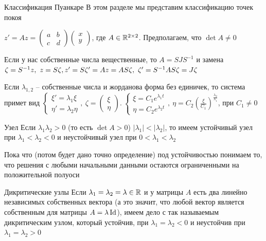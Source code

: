 \documentclass[12pt]{article}
\begin{document}
\begin{nota}{Классификация Пуанкаре}
    В этом разделе мы представим классификацию точек покоя

    $z' = Az = \begin{pmatrix}
        a & b \\
        c & d 
    \end{pmatrix} \begin{pmatrix}
        x \\ 
        y 
    \end{pmatrix}$, где $A \in \mathbb R^{2 \times 2}$. Предполагаем, что $\det A \neq 0$

    Если у нас собственные числа вещественные, то $A = SJS^{-1}$ и замена $\zeta = S^{-1}z,\ z = S\zeta,\\ z' = S\zeta' = Az = AS\zeta,\ \zeta' = S^{-1}AS\zeta = J\zeta$

    Если $\lambda_{1, 2}$ -- собственные числа и жорданова форма без единичек, то система примет вид $\begin{cases}
        \xi' = \lambda_1 \xi \\
        \eta' = \lambda_2 \eta
    \end{cases},\ \zeta = \begin{pmatrix}
        \xi \\
        \eta
    \end{pmatrix}.\ \begin{cases}
        \xi = C_1e^{\lambda_1 t} \\
        \eta = C_2e^{\lambda_2 t}
    \end{cases},\ \eta = C_2 \left(\frac{\xi}{C_1}\right)^\frac{\lambda_2}{\lambda_1}$, при $C_1 \neq 0$
\end{nota}

\begin{defin}{Узел}
    Если $\lambda_1\lambda_2 > 0$ (то есть $\det A > 0$) $|\lambda_1| < |\lambda_2|$, то имеем устойчивый узел при $\lambda_1 < \lambda_2 < 0$ и неустойчивый узел при $0 < \lambda_1 < \lambda_2$

    Пока что (потом будет дано точно определение) под устойчивостью понимаем то, что решения с любыми начальными данными остаются ограниченными на положительной полуоси
\end{defin}

\begin{defin}{Дикритические узлы}
    Если $\lambda_1 = \lambda_2 = \lambda \in \mathbb R$ и у матрицы $A$ есть два линейно независимых собственных вектора (а это значит, что любой вектор является собственным для матрицы $A = \lambda \operatorname{Id}$), имеем дело с так называемым дикритическим узлом, который устойчив, при $\lambda_1 = \lambda_2 < 0$ и неустойчив при $\lambda_1 = \lambda_2 > 0$ 
\end{defin}
\end{document}
